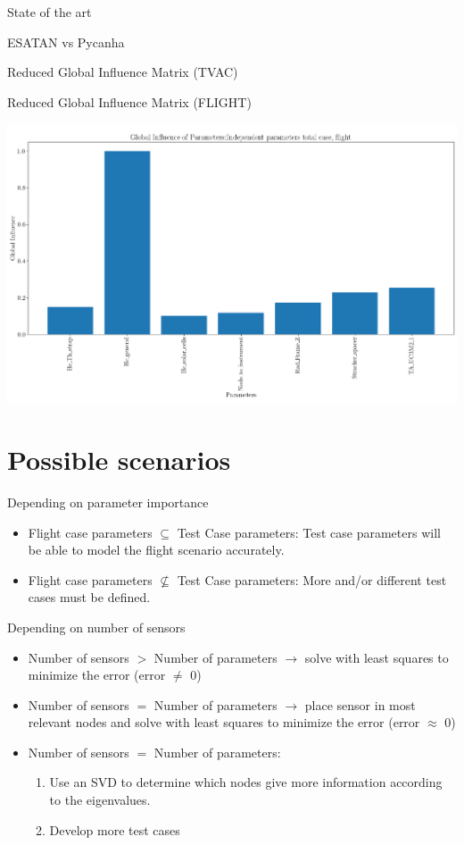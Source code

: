 \documentclass{cubeamer}
\begin{document}
\begin{frame}{State of the art}
\begin{minipage}{0.65\textwidth}
\begin{frame}{ESATAN vs Pycanha}
\begin{frame}{Reduced Global Influence Matrix (TVAC)}
\end{frame}

\begin{frame}{Reduced Global Influence Matrix (FLIGHT)}
\begin{center}
    \includegraphics[width=0.7\linewidth]{Figures/Flight/indep-iinfglobalboth.png}
\end{center}
\end{frame}

\section{Possible scenarios}
\begin{frame}{Depending on parameter importance}
    \begin{itemize}
        \item Flight case parameters $\subseteq$ Test Case parameters: Test case parameters will be able to model the flight scenario accurately.
        \\
        \item  Flight case parameters $\not \subseteq$ Test Case parameters: More and/or different test cases must be defined.
    \end{itemize}
\end{frame}
\begin{frame}{Depending on number of sensors}
    \begin{itemize}
        \item Number of sensors $>$ Number of parameters $\longrightarrow$ solve with least squares to minimize the error (error $\neq$ 0)
        \item Number of sensors $=$ Number of parameters $\longrightarrow$ place sensor in most relevant nodes and solve with least squares to minimize the error (error $\approx$ 0)
        \item Number of sensors $=$ Number of parameters:
        \begin{enumerate}
            \item Use an SVD to determine which nodes give more information according to the eigenvalues.
            \item Develop more test cases
        \end{enumerate}
    \end{itemize}
\end{frame}

\end{frame}
\end{minipage}
\end{frame}
\end{document}
